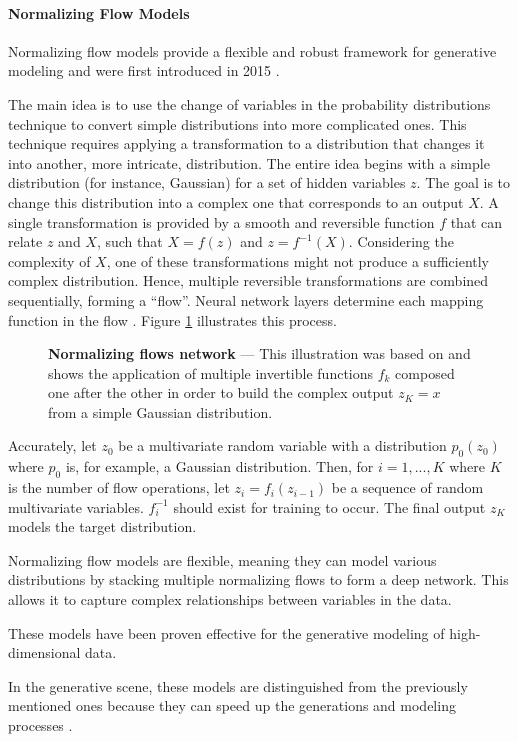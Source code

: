 \paragraph{Normalizing Flow Models} \label{sec:flow-model}

Normalizing flow models provide a flexible and robust framework for generative modeling and were first introduced in 2015 \cite{rezende_variational_2016}.

The main idea is to use the change of variables in the probability distributions technique to convert simple distributions into more complicated ones. This technique requires applying a transformation to a distribution that changes it into another, more intricate, distribution. The entire idea begins with a simple distribution (for instance, Gaussian) for a set of hidden variables $z$. The goal is to change this distribution into a complex one that corresponds to an output $X$. A single transformation is provided by a smooth and reversible function $f$ that can relate $z$ and $X$, such that $X = f (z)$ and $z = f^{- 1}(X)$. Considering the complexity of $X$, one of these transformations might not produce a sufficiently complex distribution. Hence, multiple reversible transformations are combined sequentially, forming a ``flow''. Neural network layers determine each mapping function in the flow \cite{huzaifah_deep_2021}. Figure \ref{fig:normalizing-flows} illustrates this process.

\begin{figure}[ht]
    \centering
    \caption[Normalizing flows network]{\textbf{Normalizing flows network} --- This illustration was based on \cite{weng_flow-based_2018} and shows the application of multiple invertible functions $f_k$ composed one after the other in order to build the complex output $z_K = x$ from a simple Gaussian distribution.}
    \label{fig:normalizing-flows}
\end{figure}

Accurately, let $z_0$ be a multivariate random variable with a distribution $p_0(z_0)$ where $p_0$ is, for example, a Gaussian distribution. Then, for $i = 1, ..., K$ where $K$ is the number of flow operations, let $z_i = f_i(z_{i - 1})$ be a sequence of random multivariate variables. $f_i^{-1}$ should exist for training to occur. The final output $z_K$ models the target distribution.

Normalizing flow models are flexible, meaning they can model various distributions by stacking multiple normalizing flows to form a deep network. This allows it to capture complex relationships between variables in the data.

These models have been proven effective for the generative modeling of high-dimensional data.

In the generative scene, these models are distinguished from the previously mentioned ones because they can speed up the generations and modeling processes \cite{huzaifah_deep_2021}.